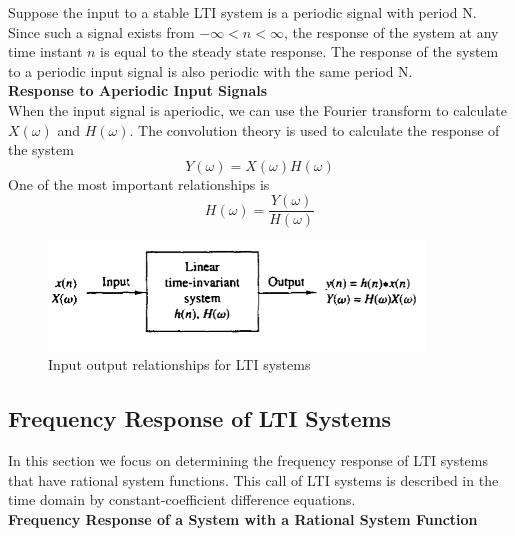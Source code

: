 \documentclass{article} %
\begin{document}
	Suppose the input to a stable LTI system is a periodic signal with period N. Since such a signal exists from $-\infty < n < \infty$, the response of the system at any time instant $n$ is equal to the steady state response. The response of the system to a periodic input signal is also periodic with the same period N. \\
	\textbf{Response to Aperiodic Input Signals}\\
	When the input signal is aperiodic, we can use the Fourier transform to calculate $X(\omega)$ and $H(\omega)$. The convolution theory is used to calculate the response of the system
	\begin{equation}
	Y(\omega) = X(\omega)H(\omega)
	\end{equation}
	One of the most important relationships is
	\begin{equation}
	H(\omega) = \frac{Y(\omega)}{H(\omega)}
	\end{equation}
	
	\begin{figure}[h]
	\centering
	\includegraphics[width=10cm]{conv_lti}
	\caption{Input output relationships for LTI systems}
	\end{figure}
	\subsection{Frequency Response of LTI Systems}
	In this section we focus on determining the frequency response of LTI systems that have rational system functions. This call of LTI systems is described in the time domain by constant-coefficient difference equations.\\
	\textbf{Frequency Response of a System with a Rational System Function}\\
	
\end{document}

